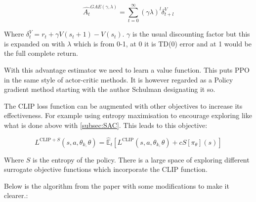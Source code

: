 \begin{equation}
\hat{A_{t}}^{GAE(\gamma, \lambda)} = \sum_{t=0}^{\infty}(\gamma\lambda)^{l}\delta_{t+l}^{V}
\end{equation}

Where $\delta_{t}^{V}=r_{t}+\gamma V(s_{t}+1)-V(s_{t})$. $\gamma$ is the usual discounting factor but this is expanded on with $\lambda$ which is from 0-1, at 0 it is TD(0) error and at 1 would be the full complete return.

With this advantage estimator we need to learn a value function. This puts PPO in the same style of actor-critic methods. It is however regarded as a Policy gradient method starting with the author Schulman designating it so.

The CLIP loss function can be augmented with other objectives to increase its effectiveness. For example using entropy maximisation to encourage exploring like what is done above with \ref{subsec:SAC}. This leads to this objective:

\begin{equation}
L^{\text{CLIP} + S}(s, a, \theta_{k, }\theta)=\hat{\mathbb{E}}_{t}\left[ L^{\text{CLIP}}(s,a, \theta_{k, }\theta)+cS\left[ \pi_{\theta}\right](s)  \right] 
\end{equation}

Where $S$ is the entropy of the policy. There is a large space of exploring different surrogate objective functions which incorporate the CLIP function.

Below is the algorithm from the paper \cite{schulmanProximalPolicyOptimization2017} with some modifications to make it clearer.:

